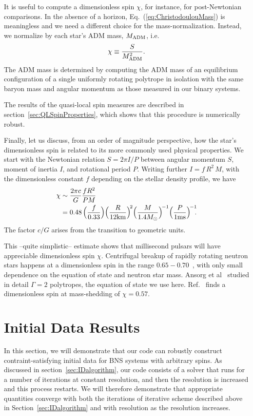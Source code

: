 {It is useful to compute a dimensionless spin $\chi$, for instance, for
post-Newtonian comparisons.  In the absence of a horizon,
Eq.~(\ref{eq:ChristodoulouMass}) is meaningless and we need a different
choice for the mass-normalization.  Instead, we normalize by each 
star's ADM mass, $M_{\rm{ADM}}$, i.e. 
\begin{equation}
\chi\equiv \frac{S}{M_{\rm ADM}^2}.
\end{equation}
The ADM mass is determined by computing the ADM mass of an equilibrium configuration of a single uniformly rotating polytrope in isolation with the same baryon mass and angular momentum as those measured in our binary systems.


The results of the
quasi-local spin measures are described in
section~\ref{sec:QLSpinProperties}, which shows that this procedure is
numerically robust.

Finally, let us discuss, from an order of magnitude perspective, how
the star's dimensionless spin is related to its more commonly used physical properties.
We start with the Newtonian relation $S=2\pi I/P$ between angular
momentum $S$, moment of inertia $I$, and rotational period $P$.
Writing further $I=f\,R^2\,M$, with the dimensionless constant $f$
depending on the stellar density profile, we have 
\begin{align}
\chi&\sim\frac{2\pi c}{G}\frac{fR^2}{PM} \nonumber\\
&=
0.48\,\Big(\frac{f}{0.33}\Big)\Big(\frac{R}{12{\rm
    km}}\Big)^{\!2}\Big(\frac{M}{1.4M_{\odot}}\Big)^{\!-1}\Big(\frac{P}{1{\rm
    ms}}\Big)^{\!-1}\!\!.
\end{align}
The factor $c/G$ arises from the transition to geometric units. 

This --quite simplistic-- estimate shows that millisecond pulsars will
have appreciable dimensionless spin $\chi$.  Centrifugal breakup of
rapidly rotating neutron stars happens at a dimensionless spin in the
range $0.65-0.70$~\cite{Lo:2010bj}, with only small dependence on the
equation of state and neutron star mass.  Ansorg et
al~\cite{Ansorg:2003br} studied in detail $\Gamma = 2$ polytropes, the
equation of state we use here.  Ref.~\cite{Ansorg:2003br} finds a
dimensionless spin at mass-shedding of $\chi=0.57$.

\section{Initial Data Results}
\label{sec:ID}

In this section, we will demonstrate that our code can robustly
construct contraint-satisfying initial data for BNS systems with
arbitrary spins. As discussed in section~\ref{sec:IDalgorithm}, our code consists of a
solver that runs for a number of iterations at constant
resolution, and then the resolution is increased and this process
restarts. We will therefore demonstrate that appropriate quantities
converge with both the iterations of iterative scheme described above in
Section~\ref{sec:IDalgorithm} and with
resolution as the resolution increases.

}
